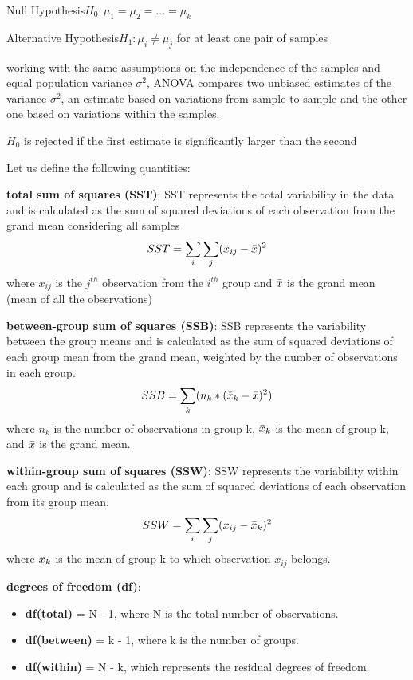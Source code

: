 \documentclass[fontsize=12 pt]{scrartcl}
\begin{document}
Null Hypothesis$H_0 : \mu_1 = \mu_2 = ... = \mu_k$

Alternative Hypothesis$H_1 : \mu_i \neq \mu_j$ for at least one pair of samples

working with the same assumptions on the independence of the samples and equal population variance $\sigma^2$, ANOVA compares two unbiased estimates of the variance $\sigma^2$, an estimate based on variations from sample to sample and the other one based on variations within the samples.\citep[p.~291]{chris}

$H_0$ is rejected if the first estimate is significantly larger than the second

Let us define the following quantities:

\textbf{total sum of squares (SST)}: SST represents the total variability in the data and is calculated as the sum of squared deviations of each observation from the grand mean considering all samples
\[ SST = \sum_i\sum_j(x_{ij} - \Bar{x})^2  \]
where $x_{ij}$ is the $j^{th}$ observation from the $i^{th}$ group and $\Bar{x}$ is the grand mean (mean of all the observations)

\textbf{between-group sum of squares (SSB)}: SSB represents the variability between the group means and is calculated as the sum of squared deviations of each group mean from the grand mean, weighted by the number of observations in each group.
\[ SSB = \sum_k(n_k * (\Bar{x}_k - \Bar{x})^2)  \]
where $n_k$ is the number of observations in group k, $\Bar{x}_k$ is the mean of group k, and $\Bar{x}$ is the grand mean.

\textbf{within-group sum of squares (SSW)}: SSW represents the variability within each group and is calculated as the sum of squared deviations of each observation from its group mean.
\[ SSW = \sum_i\sum_j(x_{ij} - \Bar{x}_k)^2  \]
where $\Bar{x}_k$ is the mean of group k to which observation $x_{ij}$ belongs.

\textbf{degrees of freedom (df)}:
\begin{itemize}
\item \textbf{df(total)} = N - 1, where N is the total number of observations.
   
\item \textbf{df(between)} = k - 1, where k is the number of groups.
   
\item \textbf{df(within)} = N - k, which represents the residual degrees of freedom.
\end{itemize}
\end{document}
